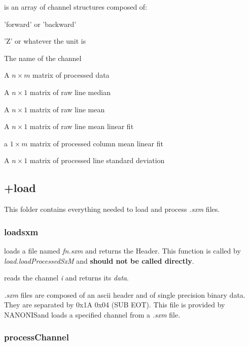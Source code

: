 \item[channels] is an array of channel structures composed of:
  \bdf
  \item[Direction] 'forward' or 'backward'
  \item[Unit] 'Z' or whatever the unit is
  \item[Name] The name of the channel
  \item[data] A $n\times m$ matrix of processed data
  \item[lineMedian] A $n\times 1$ matrix of raw line median
  \item[lineMean] A $n\times 1$ matrix of raw line mean
  \item[linePlane] A $n\times 1$ matrix of raw line mean linear fit
  \item[lineResidualSlope] a $1\times m$ matrix of processed column mean linear fit
  \item[lineStd] A $n\times 1$ matrix of processed line standard deviation
  \edf
\edf


\subsection{+load}
This folder contains everything needed to load and process \emph{.sxm} files.
\subsubsection{loadsxm}
\bdf

 loads a file named \emph{fn.sxm} and returns the Header. This function is called by \emph{load.loadProcessedSxM} and \textbf{should not be called directly}.

 reads the channel \emph{i} and returns its \emph{data}.

\edf

\emph{.sxm} files are composed of an ascii header and of single precision binary data. They are separated by 0x1A 0x04 (SUB EOT).
This file is provided by NANONIS\texttrademark and loads a specified channel from a \emph{.sxm} file.
\subsubsection{processChannel}

